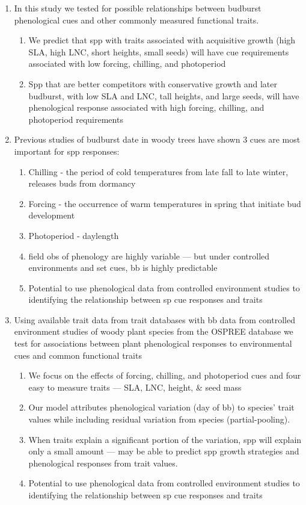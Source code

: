 \documentclass{article}
\begin{document}
\begin{enumerate}
\item In this study we tested for possible relationships between budburst phenological cues and other commonly measured functional traits.
\begin{enumerate}
\item We predict that spp with traits associated with acquisitive growth (high SLA, high LNC, short heights, small seeds) will have cue requirements associated with low forcing, chilling, and photoperiod
\item Spp that are better competitors with conservative growth and later budburst, with low SLA and LNC, tall heights, and large seeds, will have phenological response associated with high forcing, chilling, and photoperiod requirements
\end{enumerate}

\item Previous studies of budburst date in woody trees have shown 3 cues are most important for spp responses:
\begin{enumerate}
\item Chilling - the period of cold temperatures from late fall to late winter, releases buds from dormancy
\item Forcing - the occurrence of warm temperatures in spring that initiate bud development 
\item Photoperiod - daylength
\item field obs of phenology are highly variable — but under controlled environments and set cues, bb is highly predictable
\item Potential to use phenological data from controlled environment studies to identifying the relationship between sp cue responses and traits
\end{enumerate}

\item Using available trait data from trait databases with bb data from controlled environment studies of woody plant species from the OSPREE database we test for associations between plant phenological responses to environmental cues and common functional traits 
\begin{enumerate}
\item We focus on the effects of forcing, chilling, and photoperiod cues and four easy to measure traits — SLA, LNC, height, \& seed mass
\item Our model attributes phenological variation (day of bb) to species’ trait values while including residual variation from species (partial-pooling).
\item When traits explain a significant portion of the variation, spp will explain only a small amount — may be able to predict spp growth strategies and phenological responses from trait values.
\item Potential to use phenological data from controlled environment studies to identifying the relationship between sp cue responses and traits
\end{enumerate}

\end{enumerate}
\end{document}
